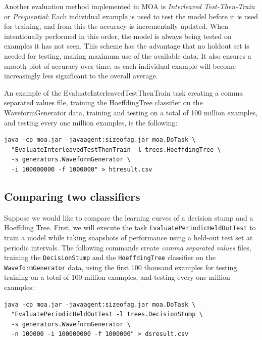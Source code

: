 \documentclass[a4paper,12pt,twoside]{book}
\begin{document}
Another evaluation method implemented in MOA is \emph{Interleaved Test-Then-Train}  or \emph{Prequential}:
 Each individual example is used to test the model
before it is used for training, and from this the accuracy is incrementally
updated. When intentionally performed in this order, the model is always
being tested on examples it has not seen. This scheme has the advantage that
no holdout set is needed for testing, making maximum use of the available
data. It also ensures a smooth plot of accuracy over time, as each individual
example will become increasingly less significant to the overall average.

An example of the EvaluateInterleavedTestThenTrain task  
creating a comma separated values file, training the
HoeffdingTree classifier on the WaveformGenerator data, training and testing on a total of 100 million
examples, and testing every one million examples, is the following:

\begin{footnotesize}\begin{verbatim}
java -cp moa.jar -javaagent:sizeofag.jar moa.DoTask \
  "EvaluateInterleavedTestThenTrain -l trees.HoeffdingTree \
  -s generators.WaveformGenerator \
  -i 100000000 -f 1000000" > htresult.csv
\end{verbatim}
\end{footnotesize}

\subsection{Comparing two classifiers}

Suppose we would like to compare the learning curves of a decision stump and a Hoeffding Tree.
First, we will execute the
 task \verb+EvaluatePeriodicHeldOutTest+ to train a model while taking snapshots of performance using a held-out test set at periodic intervals.
The following commands create {\em comma separated values} files, training the \verb+DecisionStump+ and the \verb+HoeffdingTree+ classifier on the \verb+WaveformGenerator+ data, using the first 100 thousand examples for testing, training on a total of 100 million examples, and testing every one million examples:

\begin{footnotesize}\begin{verbatim}
java -cp moa.jar -javaagent:sizeofag.jar moa.DoTask \
  "EvaluatePeriodicHeldOutTest -l trees.DecisionStump \
  -s generators.WaveformGenerator \
  -n 100000 -i 100000000 -f 1000000" > dsresult.csv
\end{verbatim}\end{footnotesize}
\end{document}
